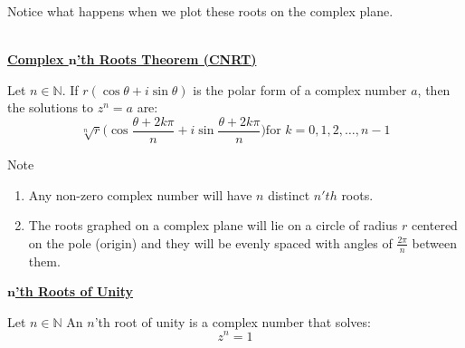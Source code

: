 \documentclass{letter}
\begin{document}
\begin{itemize}
		Notice what happens when we plot these roots on the complex plane.
		\\\\
		
		\begin{center}\;\;\;\;\;\;\;\;\;\end{center}
	\end{itemize}
	\clearpage
	
	\underline{\textbf{Complex $\mathbf{n}$'th Roots Theorem (CNRT)}}
	
	Let $n \in \mathbb{N}$. If $r(\cos \theta + i \sin \theta)$ is the polar form of a complex number $a$, then the solutions to $z^n = a$ are:
	\[ \sqrt[n]{r} \bigg( \cos \dfrac{\theta + 2k \pi}{n} + i \sin \dfrac{\theta + 2k \pi}{n} \bigg)  \text{for } k = 0, 1, 2, \dots, n-1\]
	
	Note \begin{enumerate}
		\item Any non-zero complex number will have $n$ distinct $n'th$ roots.
		\item The roots graphed on a complex plane will lie on a circle of radius $r$ centered on the pole (origin) and they will be evenly spaced with angles of $\frac{2\pi}{n}$ between them.
	\end{enumerate}
	
	\underline{\textbf{$\mathbf{n}$'th Roots of Unity}}
	
	Let $n \in \mathbb{N}$ An $n$'th root of unity is a complex number that solves:
	\[ z^n = 1 \]
	
\end{document}
